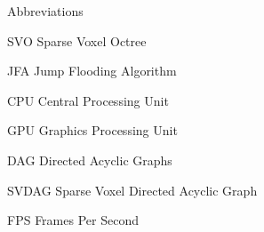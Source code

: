 \begin{dictionary}{Abbreviations}
    \item[SVO] Sparse Voxel Octree
    \item[JFA] Jump Flooding Algorithm
    \item[CPU] Central Processing Unit
    \item[GPU] Graphics Processing Unit
    \item[DAG] Directed Acyclic Graphs
    \item[SVDAG] Sparse Voxel Directed Acyclic Graph
    \item[FPS] Frames Per Second
\end{dictionary}
